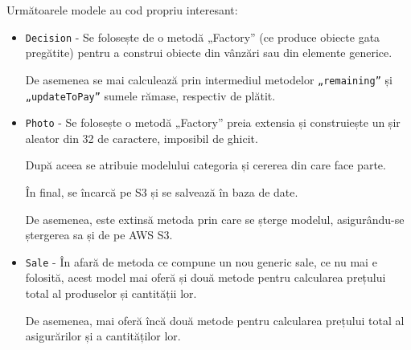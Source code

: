 	Următoarele modele au cod propriu interesant:
	\begin{itemize}
		\item \verb|Decision| - Se folosește de o metodă „Factory” (ce produce obiecte gata pregătite) pentru a construi obiecte din vânzări sau din elemente generice.

		De asemenea se mai calculează prin intermediul metodelor \verb|„remaining”| și \verb|„updateToPay”| sumele rămase, respectiv de plătit.

		\item \verb|Photo| - Se folosește o metodă „Factory” preia extensia și construiește un șir aleator din 32 de caractere, imposibil de ghicit.

		După aceea se atribuie modelului categoria și cererea din care face parte.

		În final, se încarcă pe S3 și se salvează în baza de date.

		De asemenea, este extinsă metoda prin care se șterge modelul, asigurându-se ștergerea sa și de pe AWS S3.

		\item \verb|Sale| - În afară de metoda ce compune un nou generic sale, ce nu mai e folosită, acest model mai oferă și două metode pentru calcularea prețului total al produselor și cantității lor.

		De asemenea, mai oferă încă două metode pentru calcularea prețului total al asigurărilor și a cantităților lor.
	\end{itemize}
